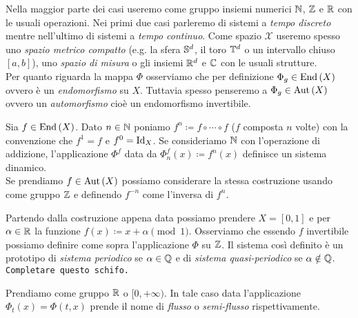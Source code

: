 Nella maggior parte dei casi useremo come gruppo insiemi numerici $ \N $, $ \Z $ e $ \R $ con le usuali operazioni. Nei primi due casi parleremo di sistemi a \emph{tempo discreto} mentre nell'ultimo di sistemi a \emph{tempo continuo}. Come spazio $ \mathcal{X} $ useremo spesso uno \emph{spazio metrico compatto} (e.g. la sfera $ \S^d $, il toro $ \T^d $ o un intervallo chiuso $ [a, b] $), uno \emph{spazio di misura} o gli insiemi $ \R^d $ e $ \C $ con le usuali strutture. \\

Per quanto riguarda la mappa $ \Phi $ osserviamo che per definizione $ \Phi_g \in \End{(X)} $ ovvero è un \emph{endomorfismo} su $ X $. Tuttavia spesso penseremo a $ \Phi_g \in \Aut{(X)} $ ovvero un \emph{automorfismo} cioè un endomorfismo invertibile. \\

\begin{example}
Sia $ f \in \End{(X)} $. Dato $ n \in \N $ poniamo $ f^n \coloneqq f \circ \cdots \circ f $ ($ f $ composta $ n $ volte) con la convenzione che $ f^1 = f $ e $ f^0 = \Id_X $. Se consideriamo $ \N $ con l'operazione di addizione, l'applicazione $ \Phi^f $ data da $ \Phi_n^f(x) \coloneqq f^n(x) $ definisce un sistema dinamico. \\
Se prendiamo $ f \in \Aut{(X)} $ possiamo considerare la stessa costruzione usando come gruppo $ \Z $ e definendo $ f^{-n} $ come l'inversa di $ f^n $. 
\end{example}

\begin{example}
	Partendo dalla costruzione appena data possiamo prendere $ X = [0, 1] $ e per $ \alpha \in \R $ la funzione $ f(x) \coloneqq x + \alpha \pmod{1} $. Osserviamo che essendo $ f $ invertibile possiamo definire come sopra l'applicazione $ \Phi $ su $ \Z $. Il sistema così definito è un prototipo di \emph{sistema periodico} se $ \alpha \in \Q $ e di \emph{sistema quasi-periodico} se $ \alpha \notin \Q $. \\
	 \texttt{Completare questo schifo.}
\end{example}

Prendiamo come gruppo $ \R $ o $ [0, +\infty) $. In tale caso data l'applicazione $ \Phi_t(x) = \Phi(t, x) $ prende il nome di \emph{flusso} o \emph{semi-flusso} rispettivamente. \\

